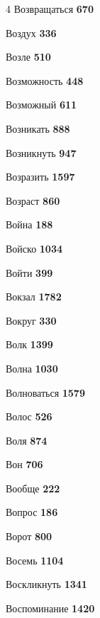 \begin{multicols}{4}
\noindent Возвращаться \dotfill \textbf{\color{secondary} 670}\par
\noindent Воздух \dotfill \textbf{\color{secondary} 336}\par
\noindent Возле \dotfill \textbf{\color{secondary} 510}\par
\noindent Возможность \dotfill \textbf{\color{secondary} 448}\par
\noindent Возможный \dotfill \textbf{\color{secondary} 611}\par
\noindent Возникать \dotfill \textbf{\color{secondary} 888}\par
\noindent Возникнуть \dotfill \textbf{\color{secondary} 947}\par
\noindent Возразить \dotfill \textbf{\color{secondary} 1597}\par
\noindent Возраст \dotfill \textbf{\color{secondary} 860}\par
\noindent Война \dotfill \textbf{\color{secondary} 188}\par
\noindent Войско \dotfill \textbf{\color{secondary} 1034}\par
\noindent Войти \dotfill \textbf{\color{secondary} 399}\par
\noindent Вокзал \dotfill \textbf{\color{secondary} 1782}\par
\noindent Вокруг \dotfill \textbf{\color{secondary} 330}\par
\noindent Волк \dotfill \textbf{\color{secondary} 1399}\par
\noindent Волна \dotfill \textbf{\color{secondary} 1030}\par
\noindent Волноваться \dotfill \textbf{\color{secondary} 1579}\par
\noindent Волос \dotfill \textbf{\color{secondary} 526}\par
\noindent Воля \dotfill \textbf{\color{secondary} 874}\par
\noindent Вон \dotfill \textbf{\color{secondary} 706}\par
\noindent Вообще \dotfill \textbf{\color{secondary} 222}\par
\noindent Вопрос \dotfill \textbf{\color{secondary} 186}\par
\noindent Ворот \dotfill \textbf{\color{secondary} 800}\par
\noindent Восемь \dotfill \textbf{\color{secondary} 1104}\par
\noindent Воскликнуть \dotfill \textbf{\color{secondary} 1341}\par
\noindent Воспоминание \dotfill \textbf{\color{secondary} 1420}\par

\end{multicols}
